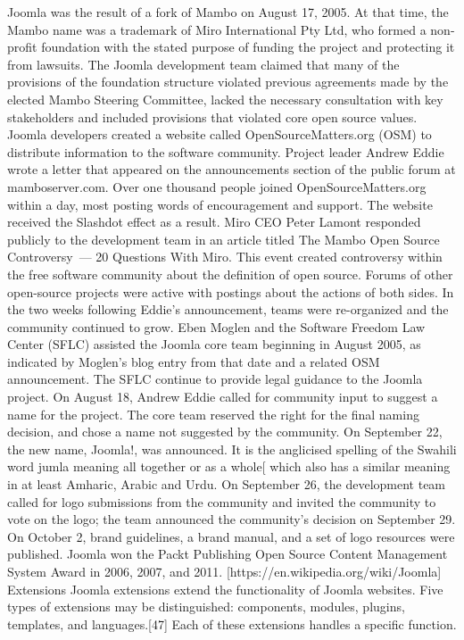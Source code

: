 Joomla was the result of a fork of Mambo on August 17, 2005. At that time, the Mambo name was a trademark of Miro International Pty Ltd, who formed a non-profit foundation with the stated purpose of funding the project and protecting it from lawsuits. The Joomla development team claimed that many of the provisions of the foundation structure violated previous agreements made by the elected Mambo Steering Committee, lacked the necessary consultation with key stakeholders and included provisions that violated core open source values.
Joomla developers created a website called OpenSourceMatters.org (OSM) to distribute information to the software community. Project leader Andrew Eddie wrote a letter that appeared on the announcements section of the public forum at mamboserver.com. Over one thousand people joined OpenSourceMatters.org within a day, most posting words of encouragement and support. The website received the Slashdot effect as a result. Miro CEO Peter Lamont responded publicly to the development team in an article titled The Mambo Open Source Controversy — 20 Questions With Miro. This event created controversy within the free software community about the definition of open source. Forums of other open-source projects were active with postings about the actions of both sides.
In the two weeks following Eddie's announcement, teams were re-organized and the community continued to grow. Eben Moglen and the Software Freedom Law Center (SFLC) assisted the Joomla core team beginning in August 2005, as indicated by Moglen's blog entry from that date and a related OSM announcement. The SFLC continue to provide legal guidance to the Joomla project.
On August 18, Andrew Eddie called for community input to suggest a name for the project. The core team reserved the right for the final naming decision, and chose a name not suggested by the community. On September 22, the new name, Joomla!, was announced. It is the anglicised spelling of the Swahili word jumla meaning all together or as a whole[ which also has a similar meaning in at least Amharic, Arabic and Urdu. On September 26, the development team called for logo submissions from the community and invited the community to vote on the logo; the team announced the community's decision on September 29. On October 2, brand guidelines, a brand manual, and a set of logo resources were published.
Joomla won the Packt Publishing Open Source Content Management System Award in 2006, 2007, and 2011. [https://en.wikipedia.org/wiki/Joomla]
Extensions
Joomla extensions extend the functionality of Joomla websites. Five types of extensions may be distinguished: components, modules, plugins, templates, and languages.[47] Each of these extensions handles a specific function.

